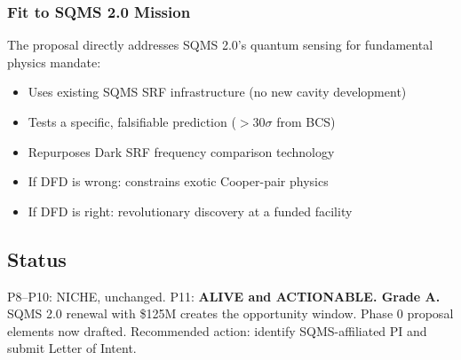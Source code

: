 \documentclass[11pt,a4paper]{article}
\begin{document}
\subsubsection{Fit to SQMS 2.0 Mission}

The proposal directly addresses SQMS 2.0's quantum sensing for fundamental physics mandate:
\begin{itemize}
\item Uses existing SQMS SRF infrastructure (no new cavity development)
\item Tests a specific, falsifiable prediction ($>30\sigma$ from BCS)
\item Repurposes Dark SRF frequency comparison technology
\item If DFD is wrong: constrains exotic Cooper-pair physics
\item If DFD is right: revolutionary discovery at a funded facility
\end{itemize}

\subsection{Status}
P8--P10: NICHE, unchanged. P11: \textbf{ALIVE and ACTIONABLE. Grade A.} SQMS 2.0 renewal with \$125M creates the opportunity window. Phase 0 proposal elements now drafted. Recommended action: identify SQMS-affiliated PI and submit Letter of Intent.
\end{document}
